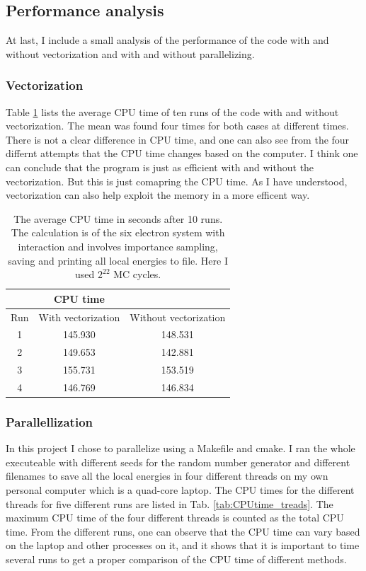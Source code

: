 \subsection{Performance analysis}

At last, I include a small analysis of the performance of the code with and without vectorization and with and without parallelizing.

\subsubsection{Vectorization}

Table \ref{tab:CPUtime_vectorization} lists the average CPU time of ten runs of the code with and without vectorization. The mean was found four times for both cases at different times. There is not a clear difference in CPU time, and one can also see from the four differnt attempts that the CPU time changes based on the computer. I think one can conclude that the program is just as efficient with and without the vectorization. But this is just comapring the CPU time. As I have understood, vectorization can also help exploit the memory in a more efficent way. 

\begin{table}[H]\caption{The average CPU time in seconds after 10 runs. The calculation is of the six electron system with interaction and involves importance sampling, saving and printing all local energies to file. Here I used $2^{22}$ MC cycles. }\label{tab:CPUtime_vectorization}
\center
\begin{tabular}{c|cc}
 & CPU time & \\ \hline
Run & With vectorization & Without vectorization \\ \hline
1 & 145.930 & 148.531 \\
2 & 149.653 & 142.881 \\
3 & 155.731 & 153.519 \\
4 & 146.769 & 146.834 \\
\end{tabular}
\end{table}

\subsubsection{Parallellization}

In this project I chose to parallelize using a Makefile and cmake. I ran the whole executeable with different seeds for the random number generator and different filenames to save all the local energies in four different threads on my own personal computer which is a quad-core laptop. The CPU times for the different threads for five different runs are listed in Tab. \ref{tab:CPUtime_treads}. The maximum CPU time of the four different threads is counted as the total CPU time. From the different runs, one can observe that the CPU time can vary based on the laptop and other processes on it, and it shows that it is important to time several runs to get a proper comparison of the CPU time of different methods. 

